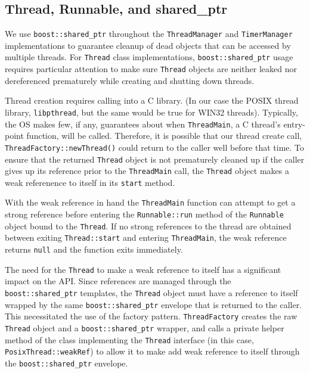 \documentclass[nocopyrightspace,blockstyle]{sigplanconf}
\begin{document}
\subsection{Thread, Runnable, and shared\_ptr}
We use \texttt{boost::shared\_ptr} throughout the \texttt{ThreadManager} and
\texttt{TimerManager} implementations to guarantee cleanup of dead objects that can
be accessed by multiple threads. For \texttt{Thread} class implementations,
\texttt{boost::shared\_ptr} usage requires particular attention to make sure
\texttt{Thread} objects are neither leaked nor dereferenced prematurely while
creating and shutting down threads.

Thread creation requires calling into a C library. (In our case the POSIX
thread library, \texttt{libpthread}, but the same would be true for WIN32 threads).
Typically, the OS makes few, if any, guarantees about when \texttt{ThreadMain}, a C thread's entry-point function, will be called. Therefore, it is
possible that our thread create call,
\texttt{ThreadFactory::newThread()} could return to the caller
well before that time. To ensure that the returned \texttt{Thread} object is not
prematurely cleaned up if the caller gives up its reference prior to the
\texttt{ThreadMain} call, the \texttt{Thread} object makes a weak referenence to
itself in its \texttt{start} method.

With the weak reference in hand the \texttt{ThreadMain} function can attempt to get
a strong reference before entering the \texttt{Runnable::run} method of the
\texttt{Runnable} object bound to the \texttt{Thread}. If no strong references to the
thread are obtained between exiting \texttt{Thread::start} and entering \texttt{ThreadMain}, the weak reference returns \texttt{null} and the function
exits immediately.

The need for the \texttt{Thread} to make a weak reference to itself has a
significant impact on the API. Since references are managed through the
\texttt{boost::shared\_ptr} templates, the \texttt{Thread} object must have a reference
to itself wrapped by the same \texttt{boost::shared\_ptr} envelope that is returned
to the caller. This necessitated the use of the factory pattern.
\texttt{ThreadFactory} creates the raw \texttt{Thread} object and a
\texttt{boost::shared\_ptr} wrapper, and calls a private helper method of the class
implementing the \texttt{Thread} interface (in this case, \texttt{PosixThread::weakRef})
 to allow it to make add weak reference to itself through the
 \texttt{boost::shared\_ptr} envelope.
\end{document}
